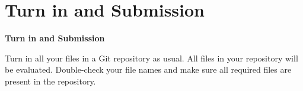 \chapter{Turn in and Submission}

\vspace{0.8cm}

{\LARGE\bfseries Turn in and Submission}

\vspace{0.5cm}

Turn in all your files in a Git repository as usual. All files in your repository
will be evaluated. Double-check your file names and make sure all required files are
present in the repository.

